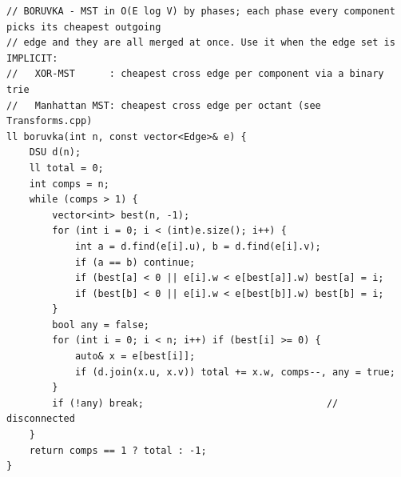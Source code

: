 \documentclass[9pt,a4paper,twocolumn]{extarticle}
\begin{document}
\begin{lstlisting}
// BORUVKA - MST in O(E log V) by phases; each phase every component picks its cheapest outgoing
// edge and they are all merged at once. Use it when the edge set is IMPLICIT:
//   XOR-MST      : cheapest cross edge per component via a binary trie
//   Manhattan MST: cheapest cross edge per octant (see Transforms.cpp)
ll boruvka(int n, const vector<Edge>& e) {
    DSU d(n);
    ll total = 0;
    int comps = n;
    while (comps > 1) {
        vector<int> best(n, -1);
        for (int i = 0; i < (int)e.size(); i++) {
            int a = d.find(e[i].u), b = d.find(e[i].v);
            if (a == b) continue;
            if (best[a] < 0 || e[i].w < e[best[a]].w) best[a] = i;
            if (best[b] < 0 || e[i].w < e[best[b]].w) best[b] = i;
        }
        bool any = false;
        for (int i = 0; i < n; i++) if (best[i] >= 0) {
            auto& x = e[best[i]];
            if (d.join(x.u, x.v)) total += x.w, comps--, any = true;
        }
        if (!any) break;                                // disconnected
    }
    return comps == 1 ? total : -1;
}
\end{lstlisting}

\filbreak
\end{document}
